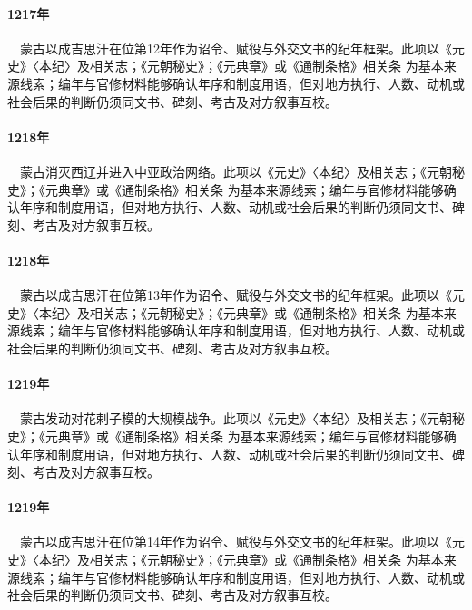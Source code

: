 \paragraph{1217年}　蒙古以成吉思汗在位第12年作为诏令、赋役与外交文书的纪年框架。此项以《元史》〈本纪〉及相关志；《元朝秘史》；《元典章》或《通制条格》相关条 为基本来源线索；编年与官修材料能够确认年序和制度用语，但对地方执行、人数、动机或社会后果的判断仍须同文书、碑刻、考古及对方叙事互校。

\paragraph{1218年}　蒙古消灭西辽并进入中亚政治网络。此项以《元史》〈本纪〉及相关志；《元朝秘史》；《元典章》或《通制条格》相关条 为基本来源线索；编年与官修材料能够确认年序和制度用语，但对地方执行、人数、动机或社会后果的判断仍须同文书、碑刻、考古及对方叙事互校。

\paragraph{1218年}　蒙古以成吉思汗在位第13年作为诏令、赋役与外交文书的纪年框架。此项以《元史》〈本纪〉及相关志；《元朝秘史》；《元典章》或《通制条格》相关条 为基本来源线索；编年与官修材料能够确认年序和制度用语，但对地方执行、人数、动机或社会后果的判断仍须同文书、碑刻、考古及对方叙事互校。

\paragraph{1219年}　蒙古发动对花剌子模的大规模战争。此项以《元史》〈本纪〉及相关志；《元朝秘史》；《元典章》或《通制条格》相关条 为基本来源线索；编年与官修材料能够确认年序和制度用语，但对地方执行、人数、动机或社会后果的判断仍须同文书、碑刻、考古及对方叙事互校。

\paragraph{1219年}　蒙古以成吉思汗在位第14年作为诏令、赋役与外交文书的纪年框架。此项以《元史》〈本纪〉及相关志；《元朝秘史》；《元典章》或《通制条格》相关条 为基本来源线索；编年与官修材料能够确认年序和制度用语，但对地方执行、人数、动机或社会后果的判断仍须同文书、碑刻、考古及对方叙事互校。

